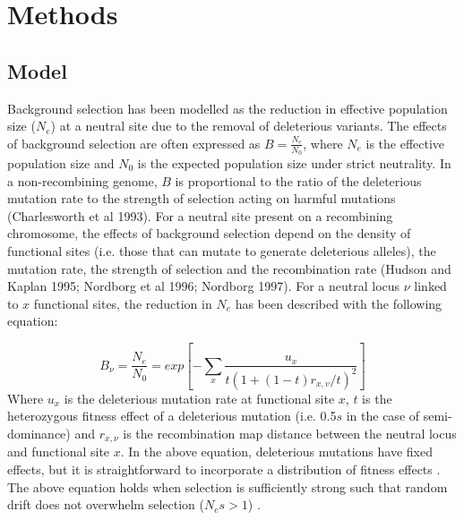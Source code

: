 \documentclass[11pt,twoside, onecolumn]{GSA_format}
\begin{document}









\section{Methods}
\subsection{Model}
Background selection has been modelled as the reduction in effective population size ($N_e$) at a neutral site due to the removal of deleterious variants. The effects of background selection are often expressed as $B = \frac{N_e}{N_0}$, where $N_e$ is the effective population size and $N_0$ is the expected population size under strict neutrality. In a non-recombining genome, $B$ is proportional to the ratio of the deleterious mutation rate to the strength of selection acting on harmful mutations (Charlesworth et al 1993). For a neutral site present on a recombining chromosome, the effects of background selection depend on the density of functional sites (i.e. those that can mutate to generate deleterious alleles), the mutation rate, the strength of selection and the recombination rate (Hudson and Kaplan 1995; Nordborg et al 1996; Nordborg 1997). For a neutral locus $\nu$ linked to $x$ functional sites, the reduction in $N_e$ has been described with the following equation:

\begin{equation}
B_{\nu} = \frac{N_e}{N_0} = exp[ -\sum\limits_x \frac{u_x}{t(1+(1-t)r_{x,v}/t)^2} ]
\label{nordborg}
\end{equation}\noindent
Where $u_x$ is the deleterious mutation rate at functional site $x$, $t$ is the heterozygous fitness effect of a deleterious mutation (i.e. 0.5$s$ in the case of semi-dominance) and $r_{x,\nu}$ is the recombination map distance between the neutral locus and functional site $x$. In the above equation, deleterious mutations have fixed effects, but it is straightforward to incorporate a distribution of fitness effects \citep{RN157}. The above equation holds when selection is sufficiently strong  such that random drift does not overwhelm selection ($N_es > 1$) \citep{Good2014}. \\
 
\end{document}
